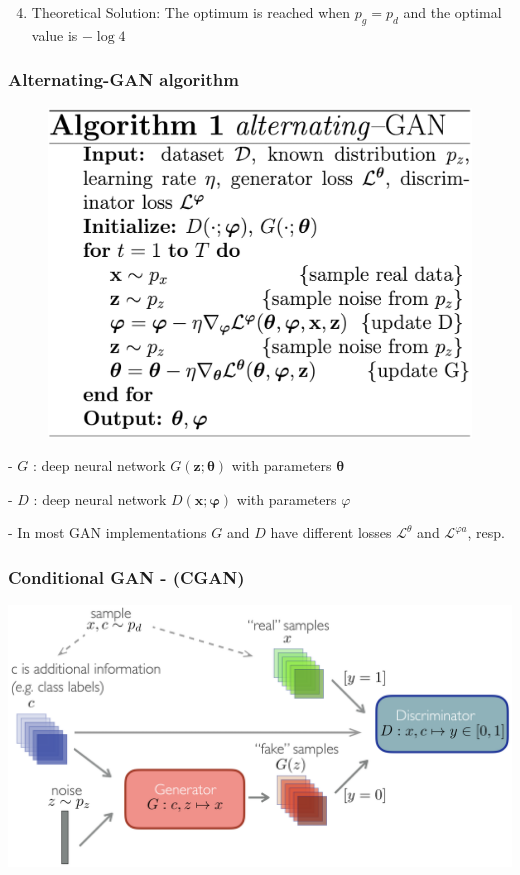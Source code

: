 \begin{enumerate}
  \setcounter{enumi}{3}
  \item Theoretical Solution: The optimum is reached when $p_{g}=p_{d}$ and the optimal value is $-\log 4$
\end{enumerate}

\subsubsection*{Alternating-GAN algorithm}

\begin{figure} 
    \centering
    \includegraphics[width=0.5\columnwidth]{figures/generative_alter_GAN.png}
    \vspace{-10pt}
\end{figure}

- $G$ : deep neural network $G(\mathbf{z} ; \boldsymbol{\theta})$ with parameters $\boldsymbol{\theta}$

- $D$ : deep neural network $D(\mathbf{x} ; \boldsymbol{\varphi})$ with parameters $\varphi$

- In most GAN implementations $G$ and $D$ have different losses $\mathcal{L}^{\theta}$ and $\mathcal{L}^{\varphi a}$, resp.



\subsubsection*{Conditional GAN - (CGAN)}
\includegraphics*[width=0.9\columnwidth]{figures/generative_CGAN.png}

